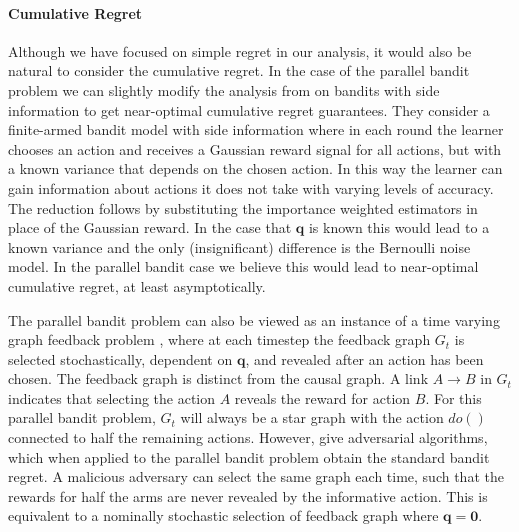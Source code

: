 \documentclass[11pt,a4paper,twoside]{report}
\renewcommand{\vec}[1]{\boldsymbol{#1}}
\theoremstyle{plain}
\theoremstyle{definition}
\begin{document}
\paragraph{Cumulative Regret}
Although we have focused on simple regret in our analysis, it would also be natural to consider the cumulative regret. In the case of the parallel bandit problem we can slightly modify the analysis from \citep{wu2015online} on bandits with side information 
to get near-optimal cumulative regret guarantees. They consider a finite-armed bandit model with side information where in each round the learner chooses an action and receives a Gaussian reward signal for all actions, but with a known variance that depends on the chosen action. In this way the learner can gain information about actions it does not take with varying levels of accuracy. The reduction follows by substituting the importance weighted estimators in place of the Gaussian reward. In the case that $\vec{q}$ is known this would lead to a known variance and the only (insignificant) difference is the Bernoulli noise model. In the parallel bandit case we believe this would lead to near-optimal cumulative regret,
at least asymptotically. 


The parallel bandit problem can also be viewed as an instance of a time varying graph feedback problem \citep{Alon2015,Kocak2014}, where at each timestep the feedback graph $G_t$ is selected stochastically, dependent on $\boldsymbol{q}$, and revealed after an action has been chosen. The feedback graph is distinct from the causal graph. A link $A \rightarrow B$ in $G_t$ indicates that selecting the action $A$ reveals the reward for action $B$. For this parallel bandit problem, $G_t$ will always be a star graph with the action $do()$ connected to half the remaining actions. However, \citet{Alon2015,Kocak2014} give adversarial algorithms, which when applied to the parallel bandit problem obtain the standard bandit regret. A malicious adversary can select the same graph each time, such that the rewards for half the arms are never revealed by the informative action. This is equivalent to a nominally stochastic selection of feedback graph where $\boldsymbol{q} = \boldsymbol{0}$. 
\end{document}

